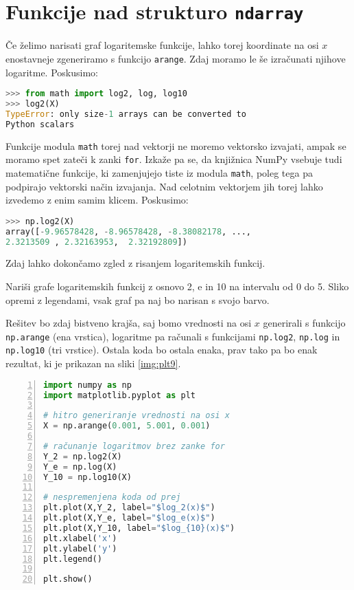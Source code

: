 \section{Funkcije nad strukturo \texttt{ndarray}}
Če želimo narisati graf logaritemske funkcije, lahko torej koordinate na osi $x$ enostavneje zgeneriramo s funkcijo \texttt{arange}. Zdaj moramo le še izračunati njihove logaritme. Poskusimo:
\begin{lstlisting}[language=Python]
>>> from math import log2, log, log10
>>> log2(X)
TypeError: only size-1 arrays can be converted to
Python scalars
\end{lstlisting}
Funkcije modula \texttt{math} torej nad vektorji ne moremo vektorsko izvajati, ampak se moramo spet zateči k zanki \texttt{for}. Izkaže pa se, da knjižnica NumPy vsebuje tudi matematične funkcije, ki zamenjujejo tiste iz modula \texttt{math}, poleg tega pa podpirajo vektorski način izvajanja. Nad celotnim vektorjem jih torej lahko izvedemo z enim samim klicem. Poskusimo:
\begin{lstlisting}[language=Python]
>>> np.log2(X)
array([-9.96578428, -8.96578428, -8.38082178, ...,
2.3213509 , 2.32163953,  2.32192809])
\end{lstlisting}

Zdaj lahko dokončamo zgled z risanjem logaritemskih funkcij.

\begin{zgled}
Nariši grafe logaritemskih funkcij z osnovo 2, $\textrm{e}$ in 10 na intervalu od 0 do 5. Sliko opremi z legendami, vsak graf pa naj bo narisan s svojo barvo.
\end{zgled}

\begin{resitev}
Rešitev bo zdaj bistveno krajša, saj bomo vrednosti na osi $x$ generirali s funkcijo \texttt{np.arange} (ena vrstica), logaritme pa računali s funkcijami \texttt{np.log2}, \texttt{np.log} in \texttt{np.log10} (tri vrstice). Ostala koda bo ostala enaka, prav tako pa bo enak rezultat, ki je prikazan na sliki \ref{img:plt9}.
\begin{lstlisting}[language=Python,numbers=left]
import numpy as np
import matplotlib.pyplot as plt

# hitro generiranje vrednosti na osi x
X = np.arange(0.001, 5.001, 0.001) 

# računanje logaritmov brez zanke for 
Y_2 = np.log2(X)
Y_e = np.log(X)
Y_10 = np.log10(X)

# nespremenjena koda od prej
plt.plot(X,Y_2, label="$log_2(x)$")
plt.plot(X,Y_e, label="$log_e(x)$")
plt.plot(X,Y_10, label="$log_{10}(x)$")
plt.xlabel('x')
plt.ylabel('y')
plt.legend()

plt.show()
\end{lstlisting}
\end{resitev}

